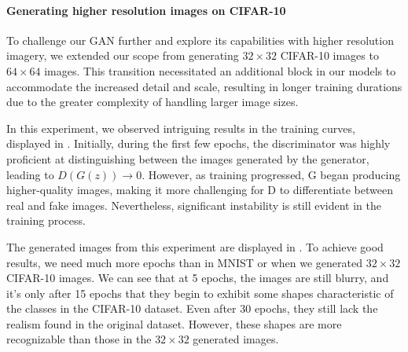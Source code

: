 \paragraph*{Generating higher resolution images on CIFAR-10}

To challenge our GAN further and explore its capabilities with higher resolution imagery, we extended our scope from generating $32 \times 32$ CIFAR-10 images to $64 \times 64$ images. This transition necessitated an additional block in our models to accommodate the increased detail and scale, resulting in longer training durations due to the greater complexity of handling larger image sizes.

In this experiment, we observed intriguing results in the training curves, displayed in . Initially, during the first few epochs, the discriminator was highly proficient at distinguishing between the images generated by the generator, leading to $D(G(z)) \rightarrow 0$. However, as training progressed, G began producing higher-quality images, making it more challenging for D to differentiate between real and fake images. Nevertheless, significant instability is still evident in the training process.

The generated images from this experiment are displayed in . To achieve good results, we need much more epochs than in MNIST or when we generated $32 \times 32$ CIFAR-10 images. We can see that at 5 epochs, the images are still blurry, and it's only after 15 epochs that they begin to exhibit some shapes characteristic of the classes in the CIFAR-10 dataset. Even after 30 epochs, they still lack the realism found in the original dataset. However, these shapes are more recognizable than those in the $32 \times 32$ generated images.

